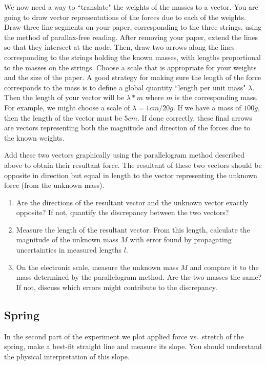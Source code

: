 We now need a way to ``translate" the weights of the masses to a vector. You are going to draw vector representations of the forces due to each of the weights. Draw three line segments on your paper, corresponding to the three strings, using the method of parallax-free reading. After removing your paper, extend the lines so that they intersect at the node. Then, draw two arrows along the lines corresponding to the strings holding the known masses, with lengths proportional to the masses on the strings. Choose a scale that is appropriate for your weights and the size of the paper. A good strategy for making sure the length of the force corresponds to the mass is to define a global quantity ``length per unit mass" $\lambda$. Then the length of your vector will be $\lambda * m$ where $m$ is the corresponding mass.  For example, we might choose a scale of $\lambda = 1cm/20g$. If we have a mass of $100g$, then the length of the vector must be $5cm$. If done correctly, these final arrows are vectors representing both the magnitude and direction of the forces due to the known weights.\myskip

Add these two vectors graphically using the parallelogram method described above to obtain their resultant force. The resultant of these two vectors should be opposite in direction but equal in length to the vector representing the unknown force (from the unknown mass).

\begin{enumerate}
    \item Are the directions of the resultant vector and the unknown vector exactly opposite? If not, quantify the discrepancy between the two vectors?
    \item Measure the length of the resultant vector. From this length, calculate the magnitude of the unknown mass $M$ with error found by propagating uncertainties in measured lengths $l$.

\item On the electronic scale, measure the unknown mass $M$ and compare it to the mass determined by the parallelogram method. Are the two masses the  same?  If not, discuss which errors might contribute to the discrepancy.
\end{enumerate}

\subsection{Spring}

In the second part of the experiment we plot applied force vs.\ stretch of the spring, make a best-fit straight line and measure its slope. You should understand the physical interpretation of this slope. \myskip


